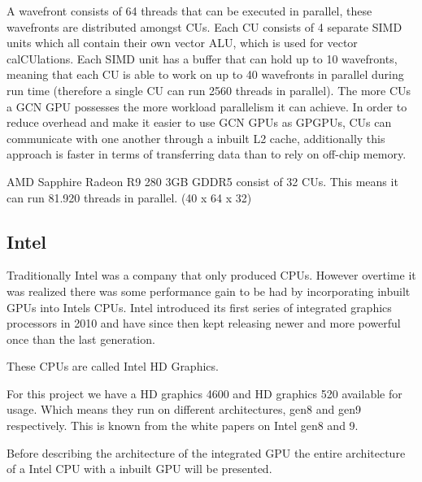 A wavefront consists of 64 threads that can be executed in parallel, these wavefronts are distributed amongst \gls{CU}s. 
Each \gls{CU} consists of 4 separate SIMD units which all contain their own vector ALU, which is used for vector cal\gls{CU}lations.  
Each SIMD unit has a buffer that can hold up to 10 wavefronts, meaning that each \gls{CU} is able to work on up to 40 wavefronts in parallel during run time (therefore a single CU can run 2560 threads in parallel). 
The more \glspl{CU} a \gls{GCN} \gls{GPU} possesses the more workload parallelism it can achieve.
In order to reduce overhead and make it easier to use \gls{GCN} \glspl{GPU} as \glspl{GPGPU}, \glspl{CU} can communicate with one another through a inbuilt L2 cache, additionally this approach is faster in terms of transferring data than to rely on off-chip memory.

AMD Sapphire Radeon R9 280 3GB GDDR5 consist of 32 \glspl{CU}.
This means it can run 81.920 threads in parallel. (40 x 64 x 32)

\subsection{Intel}
Traditionally Intel was a company that only produced \glspl{CPU}. However overtime it was realized there was some performance gain to be had by incorporating inbuilt \glspl{GPU} into Intels \glspl{CPU}.
Intel introduced its first series of integrated graphics processors in 2010 and have since then kept releasing newer and more powerful once than the last generation. 

These \glspl{CPU} are called Intel HD Graphics. 

For this project we have a HD graphics 4600 and HD graphics 520 available for usage. Which means they run on different architectures, gen8 and gen9 respectively. This is known from the white papers on Intel gen8\cite{computegen8} and 9\cite{computegen9}.

Before describing the architecture of the integrated \gls{GPU} the entire architecture of a Intel \gls{CPU} with a inbuilt \gls{GPU} will be presented.


